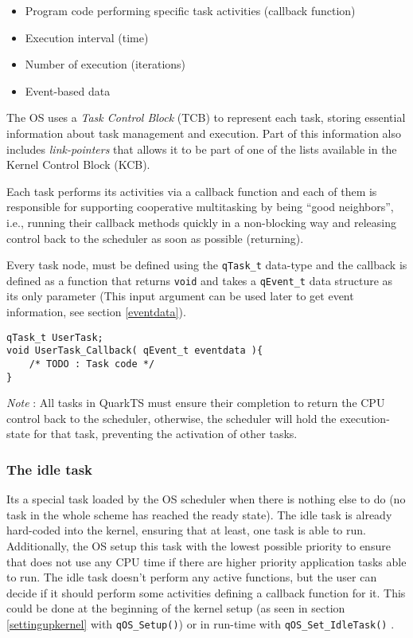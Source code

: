 \begin{itemize}
    \item Program code performing specific task activities (callback function)
    \item Execution interval (time)
    \item Number of execution (iterations)
    \item Event-based data
\end{itemize}

The OS  uses a \textit{Task Control Block} (TCB) to represent each task, storing essential information about task management and execution. Part of this information also includes \textit{link-pointers} that allows it to be part of one of the lists available in the Kernel Control Block (KCB).



Each task performs its activities via a callback function and each of them is responsible for supporting cooperative multitasking by being “good neighbors”, i.e., running their callback methods quickly in a non-blocking way and releasing control back to the scheduler as soon as possible (returning). 
\medskip

Every task node, must be defined using the \lstinline{qTask_t}  data-type and the callback is defined as a function that returns \lstinline{void} and takes a \lstinline{qEvent_t} data structure as its only parameter (This input argument can be used later to get event information, see section \ref{eventdata}).
\medskip

\begin{lstlisting}[style=CStyle]
qTask_t UserTask;
void UserTask_Callback( qEvent_t eventdata ){
    /* TODO : Task code */
}
\end{lstlisting}

\begin{tcolorbox}
\ArrowBoldDownRight \textit{Note} : All tasks in QuarkTS must ensure their completion to return the CPU control back to the scheduler, otherwise, the scheduler will hold the execution-state for that task, preventing the activation of other tasks.
\end{tcolorbox}

\subsubsection{The idle task}
Its a special task loaded by the OS scheduler when there is nothing else to do (no task in the whole scheme has reached the ready state). The idle task is already hard-coded into the kernel, ensuring that at least, one task is able to run. Additionally, the OS setup this task with the lowest possible priority to ensure that does not use any CPU time if there are higher priority application tasks able to run.
\medskip
The idle task doesn't perform any active functions, but the user can decide if it should perform some activities defining a callback function for it. This could be done at the beginning of the kernel setup (as seen in section \ref{settingupkernel} with \lstinline{qOS_Setup()}) or in run-time with \lstinline{qOS_Set_IdleTask()} .
\medskip

